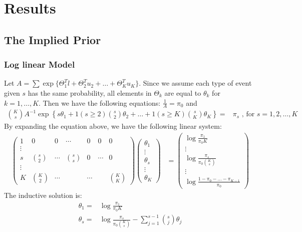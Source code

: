 \documentclass[11 pt, a4paper]{article}  %
\begin{document}
\newpage
\section{Results}
\subsection{The Implied Prior}
\subsubsection{Log linear Model}
Let $A =\sum\exp\{\Theta_1^T l + \Theta_2^{T} u_2 + \ldots + \Theta_K^T u_K\}$. Since we assume each type of event given $s$ has the same probability, all elements in $\Theta_k$ are equal to $\theta_k$ for $k =1,\ldots,K$. Then we have the following equations: $\frac{1}{A} = \pi_0$ and 
\begin{align*}
{K \choose s}A^{-1} \exp \left \{ s\theta_1 + 1(s\geq 2) {s \choose 2} \theta_2 + \ldots + 1(s\geq K) {s \choose K} \theta_K \right \} = & \pi_s \text{ , for }s = 1,2,\ldots,K
\end{align*} 
By expanding the equation above, we have the following linear system:
\begin{align*}
\begin{pmatrix}
1 & 0 & 0 & \cdots & 0 &0  & 0\\ 
\vdots &  &  &  &  &  & \\ 
s & {s \choose 2} & \cdots &{s \choose s} &0  &\cdots &0 \\ 
 \vdots&  &  &  &  &  & \\ 
 K & {K \choose 2} & \cdots  &  & \cdots &  & {K \choose K}
\end{pmatrix}
\begin{pmatrix}
\theta_1\\ 
\vdots\\ 
\theta_s\\ 
\vdots\\ 
\theta_K
\end{pmatrix} & = 
\begin{pmatrix}
\log \frac{\pi_1}{\pi_0 K}\\ 
\vdots\\ 
\log \frac{\pi_s}{\pi_0 {K \choose s}}\\ 
\vdots\\ 
\log \frac{1-\pi_0-\ldots-\pi_{K-1}}{\pi_0}
\end{pmatrix}
\end{align*}
The inductive solution is:
\begin{align*}
\theta_1 = & \log \frac{\pi_1}{\pi_0 K}\\
\theta_s = & \log \frac{\pi_s}{\pi_0 {K \choose s}} - \sum_{j=1}^{s-1}{s \choose j}\theta_j
\end{align*}
\end{document}
